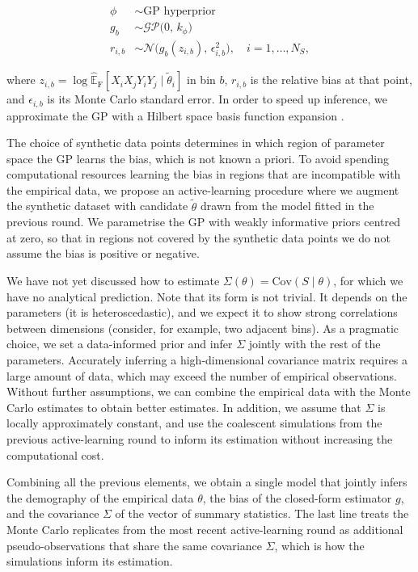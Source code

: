 \documentclass[12pt]{article}
\begin{document}
\begin{equation}
	\begin{aligned}
		\phi    & \sim \text{GP hyperprior}                                   \\
		g_b     & \sim \mathcal{GP}\big(0,\, k_\phi\big)                      \\
		r_{i,b} & \sim \mathcal{N}\big(g_b(z_{i,b}),\, \epsilon_{i,b}^2\big),
		\quad i = 1, \dots, N_S,
	\end{aligned}
	\label{eq:gp_bias}
\end{equation}

where $z_{i,b} = \log\widehat{\mathbb{E}}_{\mathrm{F}}[X_iX_jY_iY_j \mid \tilde\theta_i]$ in bin $b$, $r_{i,b}$ is the relative bias at that point, and $\epsilon_{i,b}$ is its Monte Carlo standard error. In order to speed up inference, we approximate the GP with a Hilbert space basis function expansion \citep{XXX_hsgp}.

The choice of synthetic data points determines in which region of parameter space the GP learns the bias, which is not known a priori. To avoid spending computational resources learning the bias in regions that are incompatible with the empirical data, we propose an active-learning procedure where we augment the synthetic dataset with candidate $\tilde\theta$ drawn from the model fitted in the previous round. We parametrise the GP with weakly informative priors centred at zero, so that in regions not covered by the synthetic data points we do not assume the bias is positive or negative.

We have not yet discussed how to estimate $\Sigma(\theta) = \mathrm{Cov}(S \mid \theta)$, for which we have no analytical prediction. Note that its form is not trivial. It depends on the parameters (it is heteroscedastic), and we expect it to show strong correlations between dimensions (consider, for example, two adjacent bins). As a pragmatic choice, we set a data-informed prior and infer $\Sigma$ jointly with the rest of the parameters. Accurately inferring a high-dimensional covariance matrix requires a large amount of data, which may exceed the number of empirical observations. Without further assumptions, we can combine the empirical data with the Monte Carlo estimates to obtain better estimates. In addition, we assume that $\Sigma$ is locally approximately constant, and use the coalescent simulations from the previous active-learning round to inform its estimation without increasing the computational cost.

Combining all the previous elements, we obtain a single model that jointly infers the demography of the empirical data $\theta$, the bias of the closed-form estimator $g$, and the covariance $\Sigma$ of the vector of summary statistics. The last line treats the Monte Carlo replicates from the most recent active-learning round as additional pseudo-observations that share the same covariance $\Sigma$, which is how the simulations inform its estimation.
\end{document}
